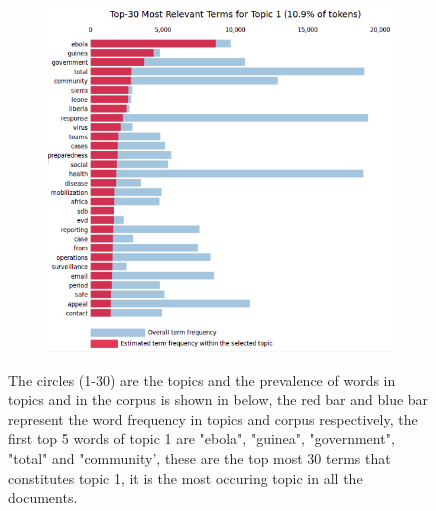 \begin{figure}[h!]
\begin{subfigure}[h]{0.60\textwidth}
        \includegraphics[width=\textwidth]{c4_8_orig.png}
        \label{fig:trapez2}
    \end{subfigure}
    \caption{The circles (1-30) are the topics and the prevalence of words in topics and in the corpus is shown in below, the red bar and blue bar represent the word frequency in topics and corpus respectively, the first top 5 words of topic 1 are "ebola", "guinea", "government", "total"  and "community', these are the top most 30 terms that constitutes topic 1, it is the most occuring topic in all the documents.}\label{figure 4.6}
\end{figure}
%


